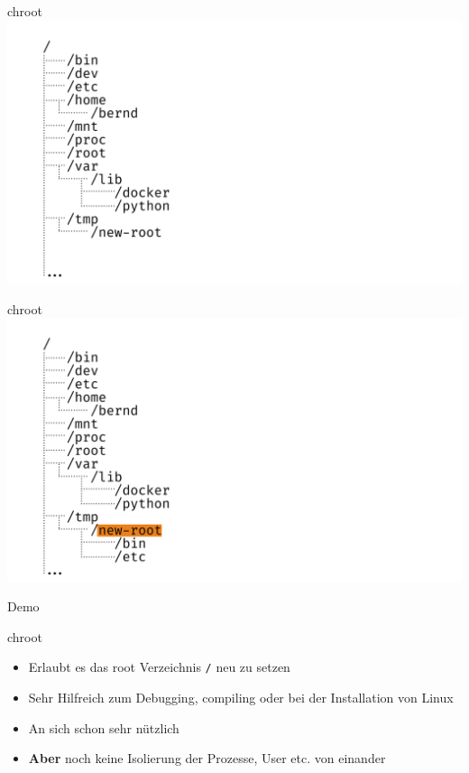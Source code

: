 \documentclass{beamer}
\begin{document}
  \begin{frame}{chroot}
    \includegraphics[width=\textwidth]{fs-tree}
  \end{frame}
  \begin{frame}{chroot}
    \includegraphics[width=\textwidth]{fs-tree-highlight}
  \end{frame}
  \begin{frame}[standout]
    Demo
  \end{frame}
  \begin{frame}{chroot}
    \begin{itemize}
      \item Erlaubt es das root Verzeichnis \texttt{/} neu zu setzen
      \item Sehr Hilfreich zum Debugging, compiling oder bei der Installation von Linux
      \item An sich schon sehr nützlich
      \item \textbf{Aber} noch keine Isolierung der Prozesse, User etc. von einander
    \end{itemize}
  \end{frame}
  
\end{document}
